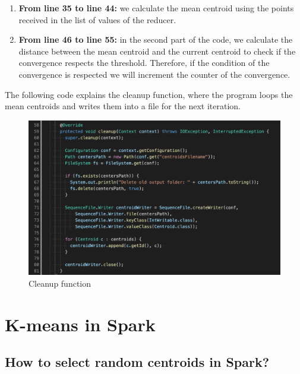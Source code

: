 \documentclass{book}
\begin{document}
    \begin{enumerate}
        \item \textbf{From line 35 to line 44:} we calculate the mean centroid using the points received in the list of values of the reducer. 
        \item \textbf{From line 46 to line 55:} in the second part of the code, we calculate the distance between the mean centroid and the current centroid to check if the convergence respects the threshold. Therefore, if the condition of the convergence is respected we will increment the counter of the convergence. 
    \end{enumerate}

    The following code explains the cleanup function, where the program loops the mean centroids and writes them into a file for the next iteration. 

    \begin{figure}[H]
        \includegraphics[width=12cm]{code/cleanup}
        \centering
        \caption{Cleanup function}
    \end{figure}

    \section{K-means in Spark}
    \paragraph{}

    \subsection{How to select random centroids in Spark?}
    \paragraph{}
\end{document}
